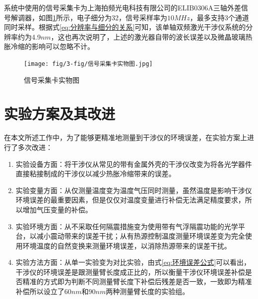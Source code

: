 系统中使用的信号采集卡为上海拍频光电科技有限公司的ELIB0306A三轴外差信号解调器，如图\ref{fig:信号采集卡实物图}所示，电子细分为32，信号采样率为$10MHz$，最多支持3个通道同时采样\cite{信号处理卡}。根据式\eqref{eq:分辨率与细分的关系}可知，该单轴双频激光干涉仪系统的分辨率约为4.9$nm$，这也再次说明了，上述的激光器自带的波长误差以及微晶玻璃热胀冷缩的影响可以忽略不计。
\begin{figure}[htb]
    \centering
    \texttt{[image: fig/3-fig/信号采集卡实物图.jpg]}
    \caption{信号采集卡实物图}
    \label{fig:信号采集卡实物图}
\end{figure}

\section{实验方案及其改进}
在本文所述工作中，为了能够更精准地测量到干涉仪的环境误差，在实验方案上进行了多次改进：
\begin{enumerate}
    \item 实验设备方面：将干涉仪从常见的带有金属外壳的干涉仪改变为将各光学器件直接粘接制成的干涉仪以减少热胀冷缩带来的误差。
    \item 实验变量方面：从仅测量温度变为温度气压同时测量，虽然温度是影响干涉仪环境误差的最重要因素，但是仅仅对温度变量进行补偿无法满足精度要求，所以增加气压变量的补偿。
    \item 实验环境方面：从不采取任何隔震措施变为使用带有气浮隔震功能的光学平台，以减小震动带来的误差干扰；从有热源控制温度测量环境误差变为完全使用环境温度的自然变换来测量环境误差，以消除热源带来的误差干扰。
    \item 实验方法方面：从单一实验变为对比实验，由式\eqref{eq:环境误差公式}可以看出，干涉仪的环境误差是跟测量臂长度成正比的，所以衡量干涉仪环境误差补偿是否精准的方式即为判断不同测量臂长度下补偿后残差是否一致，一致即为精准补偿所以设立了60$nm$和90$nm$两种测量臂长度的实验组。
  \end{enumerate}
